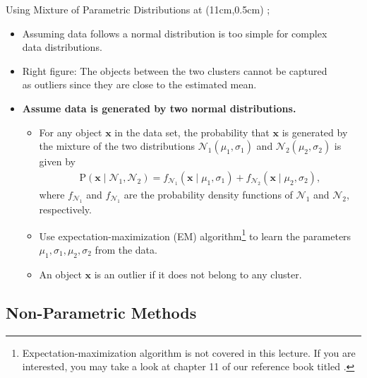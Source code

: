 \begin{frame}{Using Mixture of Parametric Distributions}
	\tikzoverlay at (11cm,0.5cm) {};
	\begin{itemize}
		\item Assuming data follows a normal distribution is too simple for complex\\ data distributions.
		\item Right figure: The objects between the two clusters cannot be captured\\ as outliers since they are close to the estimated mean.
		\item \textbf{Assume data is generated by {\color{airforceblue}two normal distributions.}}
		      \begin{itemize}
			      \item For any object $\mathbf{x}$ in the data set, the probability that $\mathbf{x}$ is generated by the mixture of the two distributions $\mathcal{N}_1(\mu_1, \sigma_1)$ and $\mathcal{N}_2(\mu_2, \sigma_2)$ is given by
			            \begin{align*}
				            \text{P}(\mathbf{x} \; \vert \; \mathcal{N}_1, \mathcal{N}_2) = f_{\mathcal{N}_1}(\mathbf{x} \; \vert \; \mu_1, \sigma_1) + f_{\mathcal{N}_2}(\mathbf{x} \; \vert \; \mu_2, \sigma_2),
			            \end{align*}
			            where $f_{\mathcal{N}_1}$ and $f_{\mathcal{N}_1}$ are the probability density functions of $\mathcal{N}_1$ and $\mathcal{N}_2$, respectively.
			      \item Use expectation-maximization (EM) algorithm\footnote{Expectation-maximization algorithm is not covered in this lecture. If you are interested, you may take a look at chapter 11 of our reference book titled .} to learn the parameters $\mu_1, \sigma_1, \mu_2, \sigma_2$ from the data.
			      \item An object $\mathbf{x}$ is an outlier if it does not belong to any cluster.
		      \end{itemize}
	\end{itemize}
\end{frame}

\subsection{Non-Parametric Methods}

